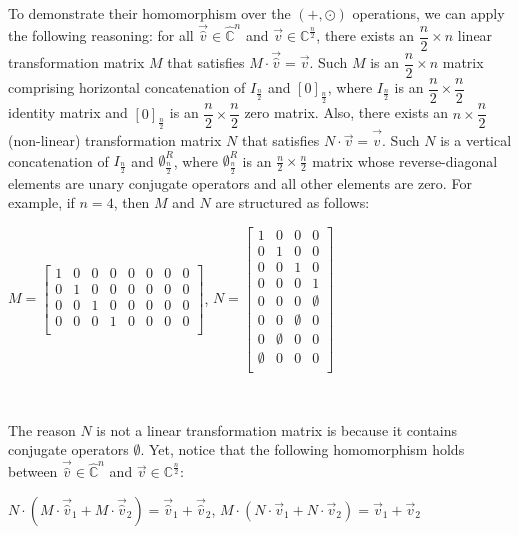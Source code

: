  To demonstrate their homomorphism over the $(+, \odot)$ operations, we can apply the following reasoning: for all $\vec{\hat{v}} \in \mathbb{\hat{C}}^{n}$ and $\vec{v} \in \mathbb{C}^{\frac{n}{2}}$, there exists an $\dfrac{n}{2} \times n$ linear transformation matrix $M$ that satisfies $M \cdot \vec{\hat{v}} = \vec{v}$. Such $M$ is an $\dfrac{n}{2} \times n$ matrix comprising horizontal concatenation of $I_{\frac{n}{2}}$ and $[0]_{\frac{n}{2}}$, where $I_{\frac{n}{2}}$ is an $\dfrac{n}{2} \times \dfrac{n}{2}$ identity matrix and $[0]_{\frac{n}{2}}$ is an $\dfrac{n}{2} \times \dfrac{n}{2}$ zero matrix. Also, there exists an $n \times \dfrac{n}{2}$ (non-linear) transformation matrix $N$ that satisfies $N \cdot \vec{{v}} = \vec{\hat v}$. Such $N$ is a vertical concatenation of $I_{\frac{n}{2}}$ and $\bm{\emptyset}_{\frac{n}{2}}^R$, where $\bm{\emptyset}_{\frac{n}{2}}^R$ is an $\frac{n}{2} \times \frac{n}{2}$ matrix whose reverse-diagonal elements are unary conjugate operators and all other elements are zero. For example, if $n = 4$, then $M$ and $N$ are structured as follows:

$M = \begin{bmatrix}
1 & 0 & 0 & 0 & 0 & 0 & 0 & 0\\
0 & 1 & 0 & 0 & 0 & 0 & 0 & 0\\
0 & 0 & 1 & 0 & 0 & 0 & 0 & 0\\
0 & 0 & 0 & 1 & 0 & 0 & 0 & 0\\
\end{bmatrix}
$, \text{ } $N = 
\begin{bmatrix}
1 & 0 & 0 & 0\\
0 & 1 & 0 & 0\\
0 & 0 & 1 & 0\\
0 & 0 & 0 & 1\\
0 & 0 & 0 & \emptyset\\
0 & 0 & \emptyset & 0\\
0 & \emptyset & 0 & 0\\
\emptyset & 0 & 0 & 0\\
\end{bmatrix}$

$ $ 

The reason $N$ is not a linear transformation matrix is because it contains conjugate operators $\emptyset$. Yet, notice that the following homomorphism holds between $\vec{\hat v} \in \mathbb{\hat C}^{n}$ and $\vec{v} \in \mathbb{C}^{\frac{n}{2}}$:

$N\cdot (M\cdot\vec{\hat v}_1 + M\cdot\vec{\hat v}_2) = \vec{\hat v}_1 + \vec{\hat v}_2$, \text{ } $M\cdot (N\cdot\vec{v}_1 + N\cdot\vec{v}_2) = \vec{v}_1 + \vec{v}_2$

